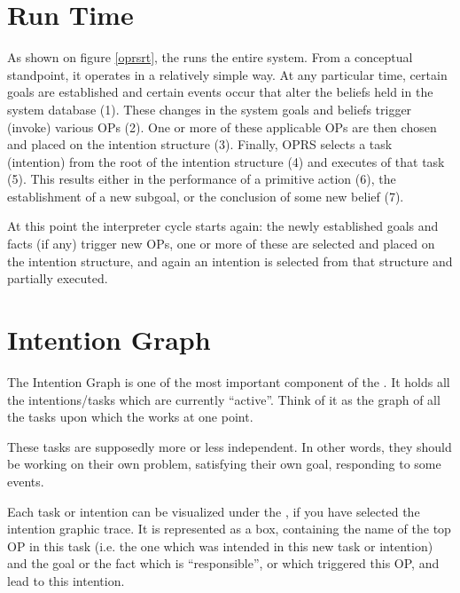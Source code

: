 \section{Run Time}


As shown on figure \ref{oprsrt}, the \CPK{} runs the entire system. From a
conceptual standpoint, it operates in a relatively simple way. At any
particular time, certain goals are established and certain events occur
that alter the beliefs held in the system database (1). These changes in
the system goals and beliefs trigger (invoke) various OPs (2). One or more
of these applicable OPs are then chosen and placed on the intention
structure (3). Finally, OPRS selects a task (intention) from the root of
the intention structure (4) and executes  of that task (5).
This results either in the performance of a primitive action (6), the
establishment of a new subgoal, or the conclusion of some new belief (7).

At this point the interpreter cycle starts again: the newly established
goals and facts (if any) trigger new OPs, one or more of these are
selected and placed on the intention structure, and again an intention is
selected from that structure and partially executed.

\section{Intention Graph}

The Intention Graph is one of the most important component of the \CPK{}.
It holds all the intentions/tasks which are currently ``active''. Think of
it as the graph of all the tasks upon which the \CPK{} works at one point.

These tasks are supposedly more or less independent. In other words, they
should be working on their own problem, satisfying their own goal, responding
to some events.




Each task or intention can be visualized under the \XPK{}, if you have selected
the intention graphic trace. It is represented as a box, containing the name of
the top OP in this task (i.e. the one which was intended in this new task or
intention) and the goal or the fact which is ``responsible'', or which
triggered this OP, and lead to this intention.

